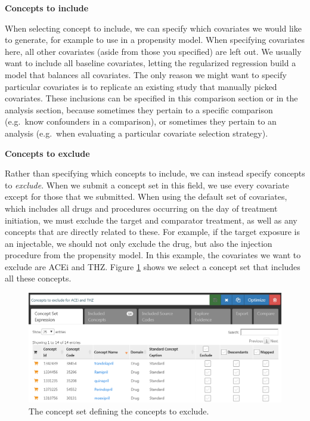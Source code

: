 \documentclass[]{book}
\begin{document}
\textbf{Concepts to include}

When selecting concept to include, we can specify which covariates we would like to generate, for example to use in a propensity model. When specifying covariates here, all other covariates (aside from those you specified) are left out. We usually want to include all baseline covariates, letting the regularized regression build a model that balances all covariates. The only reason we might want to specify particular covariates is to replicate an existing study that manually picked covariates. These inclusions can be specified in this comparison section or in the analysis section, because sometimes they pertain to a specific comparison (e.g.~know confounders in a comparison), or sometimes they pertain to an analysis (e.g.~when evaluating a particular covariate selection strategy).

\textbf{Concepts to exclude}

Rather than specifying which concepts to include, we can instead specify concepts to \emph{exclude}. When we submit a concept set in this field, we use every covariate except for those that we submitted. When using the default set of covariates, which includes all drugs and procedures occurring on the day of treatment initiation, we must exclude the target and comparator treatment, as well as any concepts that are directly related to these. For example, if the target exposure is an injectable, we should not only exclude the drug, but also the injection procedure from the propensity model. In this example, the covariates we want to exclude are ACEi and THZ. Figure \ref{fig:covsToExclude} shows we select a concept set that includes all these concepts.

\begin{figure}

{\centering \includegraphics[width=1\linewidth]{images/PopulationLevelEstimation/covsToExclude} 

}

\caption{The concept set defining the concepts to exclude.}\label{fig:covsToExclude}
\end{figure}
\end{document}
